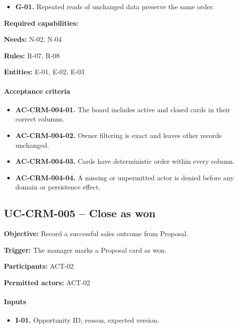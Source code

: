 \documentclass[10pt,a4paper]{article}
\begin{document}
\begin{itemize}

\item \textbf{G-01.} Repeated reads of unchanged data preserve the same order.

\end{itemize}

\textbf{Required capabilities:} 

\textbf{Needs:} N-02, N-04

\textbf{Rules:} R-07, R-08

\textbf{Entities:} E-01, E-02, E-03

\paragraph{Acceptance criteria}

\begin{itemize}

\item \textbf{AC-CRM-004-01.} The board includes active and closed cards in their correct columns.

\item \textbf{AC-CRM-004-02.} Owner filtering is exact and leaves other records unchanged.

\item \textbf{AC-CRM-004-03.} Cards have deterministic order within every column.

\item \textbf{AC-CRM-004-04.} A missing or unpermitted actor is denied before any domain or persistence effect.

\end{itemize}

\subsection{UC-CRM-005 -- Close as won}

\textbf{Objective:} Record a successful sales outcome from Proposal.

\textbf{Trigger:} The manager marks a Proposal card as won.

\textbf{Participants:} ACT-02

\textbf{Permitted actors:} ACT-02

\paragraph{Inputs}

\begin{itemize}

\item \textbf{I-01.} Opportunity ID, reason, expected version.

\end{itemize}
\end{document}
